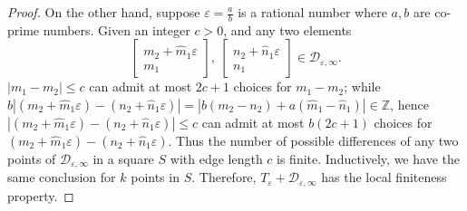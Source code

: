 \documentclass[12pt, reqno]{amsart}
\numberwithin{equation}{section}
\begin{document}
\begin{proof}
On the other hand, suppose $\varepsilon=\frac ab$ is a rational number where $a,b$ are co-prime numbers. Given an integer $c>0$, and any two elements
$$\left[\begin{array}{c}
m_2+\widehat{m}_1\varepsilon\\
m_1
\end{array}\right], \  \left[\begin{array}{c}
n_2+\widehat{n}_1\varepsilon\\
n_1
\end{array}\right]\in {\mathcal D}_{\varepsilon,\infty}.$$
$|m_1-m_2|\le c$ can admit at most $2c+1$ choices for $m_1-m_2$; while $b|(m_2+\widehat{m}_1\varepsilon)-(n_2+\widehat{n}_1\varepsilon)|=|b(m_2-n_2)+a(\widehat{m}_1-\widehat{n}_1)|\in {\mathbb Z}$, hence  $|(m_2+\widehat{m}_1\varepsilon)-(n_2+\widehat{n}_1\varepsilon)|\le c$ can admit at most $b(2c+1)$ choices for $(m_2+\widehat{m}_1\varepsilon)-(n_2+\widehat{n}_1\varepsilon)$. Thus the number of possible differences of any two points of ${\mathcal D}_{\varepsilon,\infty}$ in a square $S$ with edge length $c$ is finite. Inductively, we have the same conclusion for $k$ points in $S$. Therefore, $T_\varepsilon+{\mathcal D}_{\varepsilon,\infty}$ has the local finiteness property.
\end{proof}
\end{document}
